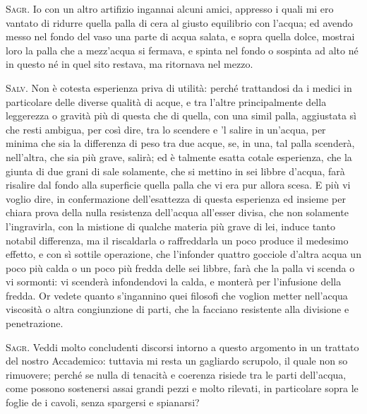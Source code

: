 \documentclass[11pt,twoside,openany]{book}
\newcommand{\speaker}[1]{\textcolor{rubric}{\textsc{#1}}\space}
\begin{document}
\speaker{Sagr.} Io con un altro artifizio ingannai alcuni amici, appresso i quali mi ero vantato di ridurre quella palla di cera al giusto equilibrio con l'acqua; ed avendo messo nel fondo del vaso una parte di acqua salata, e sopra quella dolce, mostrai loro la palla che a mezz'acqua si fermava, e spinta nel fondo o sospinta ad alto né in questo né in quel sito restava, ma ritornava nel mezzo.

\speaker{Salv.} Non è cotesta esperienza priva di utilità: perché trattandosi da i medici in particolare delle diverse qualità di acque, e tra l'altre principalmente della leggerezza o gravità più di questa che di quella, con una simil palla, aggiustata sì che resti ambigua, per così dire, tra lo scendere e 'l salire in un'acqua, per minima che sia la differenza di peso tra due acque, se, in una, tal palla scenderà, nell'altra, che sia più grave, salirà; ed è talmente esatta cotale esperienza, che la giunta di due grani di sale solamente, che si mettino in sei libbre d'acqua, farà risalire dal fondo alla superficie quella palla che vi era pur allora scesa. E più vi voglio dire, in confermazione dell'esattezza di questa esperienza ed insieme per chiara prova della nulla resistenza dell'acqua all'esser divisa, che non solamente l'ingravirla, con la mistione di qualche materia più grave di lei, induce tanto notabil differenza, ma il riscaldarla o raffreddarla un poco produce il medesimo effetto, e con sì sottile operazione, che l'infonder quattro gocciole d'altra acqua un poco più calda o un poco più fredda delle sei libbre, farà che la palla vi scenda o vi sormonti: vi scenderà infondendovi la calda, e monterà per l'infusione della fredda. Or vedete quanto s'ingannino quei filosofi che voglion metter nell'acqua viscosità o altra congiunzione di parti, che la facciano resistente alla divisione e penetrazione.

\speaker{Sagr.} Veddi molto concludenti discorsi intorno a questo argomento in un trattato del nostro Accademico: tuttavia mi resta un gagliardo scrupolo, il quale non so rimuovere; perché se nulla di tenacità e coerenza risiede tra le parti dell'acqua, come possono sostenersi assai grandi pezzi e molto rilevati, in particolare sopra le foglie de i cavoli, senza spargersi e spianarsi?
\end{document}
